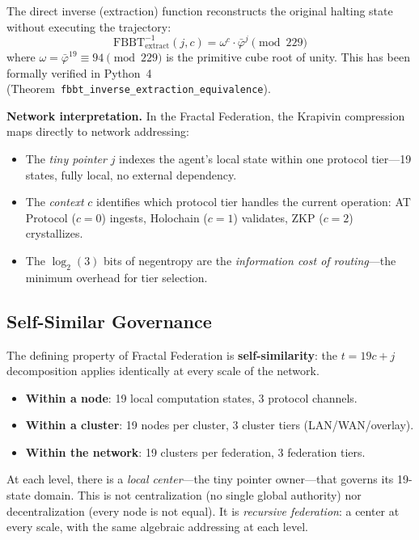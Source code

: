 \documentclass[12pt,a4paper]{article}
\begin{document}
The direct inverse (extraction) function reconstructs the original halting state without executing the trajectory:
\begin{equation}
\mathrm{FBBT}^{-1}_{\mathrm{extract}}(j, c) = \omega^c \cdot \bar{\varphi}^j \pmod{229}
\end{equation}
where $\omega = \bar{\varphi}^{19} \equiv 94 \pmod{229}$ is the primitive cube root of unity. This has been formally verified in Python~4 (Theorem~\texttt{fbbt\_inverse\_extraction\_equivalence}).

\textbf{Network interpretation.} In the Fractal Federation, the Krapivin compression maps directly to network addressing:
\begin{itemize}[noitemsep]
\item The \emph{tiny pointer} $j$ indexes the agent's local state within one protocol tier---19 states, fully local, no external dependency.
\item The \emph{context} $c$ identifies which protocol tier handles the current operation: AT Protocol ($c=0$) ingests, Holochain ($c=1$) validates, ZKP ($c=2$) crystallizes.
\item The $\log_2(3)$ bits of negentropy are the \emph{information cost of routing}---the minimum overhead for tier selection.
\end{itemize}

\subsection{Self-Similar Governance}
\label{subsec:self-similar}

The defining property of Fractal Federation is \textbf{self-similarity}: the $t = 19c + j$ decomposition applies identically at every scale of the network.

\begin{itemize}[noitemsep]
\item \textbf{Within a node}: 19 local computation states, 3 protocol channels.
\item \textbf{Within a cluster}: 19 nodes per cluster, 3 cluster tiers (LAN/WAN/overlay).
\item \textbf{Within the network}: 19 clusters per federation, 3 federation tiers.
\end{itemize}

At each level, there is a \emph{local center}---the tiny pointer owner---that governs its 19-state domain. This is not centralization (no single global authority) nor decentralization (every node is not equal). It is \emph{recursive federation}: a center at every scale, with the same algebraic addressing at each level.
\end{document}
